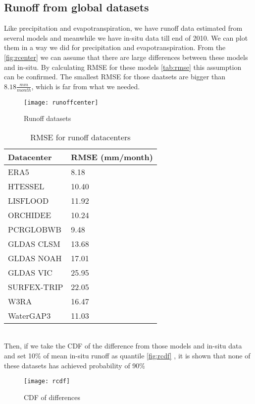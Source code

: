 \subsection{Runoff from global datasets}
Like precipitation and evapotranspiration, we have runoff data estimated from several models and meanwhile we have in-situ data till end of 2010. We can plot them in a way we did for precipitation and evapotranspiration. From the \autoref{fig:rcenter} we can assume that there are large differences between these models and in-situ. By calculating RMSE for these models \autoref{tab:rmse} this assumption can be confirmed. The smallest RMSE for those daatsets are bigger than $8.18 \frac{mm}{month}$, which is far from what we needed.
\begin{figure}[htbp]
	\centering
	\texttt{[image: runoffcenter]} %
	\caption{Runoff datasets} 
	\label{fig:rcenter}
\end{figure}
\begin{table}[htbp]\label{tab:rmse} \centering
	\begin{tabular}{|l|l|}
		\hline
		Datacenter  & RMSE (mm/month) \\ \hline
		ERA5        & 8.18  \\ \hline
		HTESSEL     & 10.40 \\ \hline
		LISFLOOD    & 11.92 \\ \hline
		ORCHIDEE    & 10.24 \\ \hline
		PCRGLOBWB   & 9.48  \\ \hline
		GLDAS CLSM  & 13.68 \\ \hline
		GLDAS NOAH  & 17.01 \\ \hline
		GLDAS VIC   & 25.95 \\ \hline
		SURFEX-TRIP & 22.05 \\ \hline
		W3RA        & 16.47 \\ \hline
		WaterGAP3   & 11.03 \\ \hline
	\end{tabular}
	\caption{RMSE for runoff datacenters}
\end{table}\\
Then, if we take the CDF of the difference from those models and in-situ data and set 10\% of mean in-situ runoff as quantile \autoref{fig:rcdf} , it is shown that none of these datasets has achieved probability of 90\%
\begin{figure}[htbp]
	\centering
	\texttt{[image: rcdf]} %
	\caption{CDF of differences} 
	\label{fig:rcdf}
\end{figure}\\
